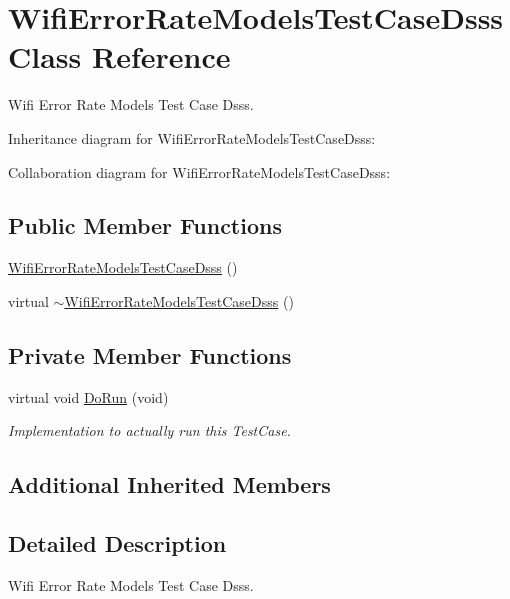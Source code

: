 \hypertarget{classWifiErrorRateModelsTestCaseDsss}{}\section{Wifi\+Error\+Rate\+Models\+Test\+Case\+Dsss Class Reference}
\label{classWifiErrorRateModelsTestCaseDsss}


Wifi Error Rate Models Test Case Dsss.  




Inheritance diagram for Wifi\+Error\+Rate\+Models\+Test\+Case\+Dsss\+:


Collaboration diagram for Wifi\+Error\+Rate\+Models\+Test\+Case\+Dsss\+:
\subsection*{Public Member Functions}
\begin{DoxyCompactItemize}
\item 
\hyperlink{classWifiErrorRateModelsTestCaseDsss_af4057fa8aa01337aef8dde760cce58ed}{Wifi\+Error\+Rate\+Models\+Test\+Case\+Dsss} ()
\item 
virtual \hyperlink{classWifiErrorRateModelsTestCaseDsss_a1b72308f7c00e3222d6d9fe3e170dd42}{$\sim$\+Wifi\+Error\+Rate\+Models\+Test\+Case\+Dsss} ()
\end{DoxyCompactItemize}
\subsection*{Private Member Functions}
\begin{DoxyCompactItemize}
\item 
virtual void \hyperlink{classWifiErrorRateModelsTestCaseDsss_a9d90cab0287b443edea29e5bcaf44e06}{Do\+Run} (void)
\begin{DoxyCompactList}\small\item\em Implementation to actually run this Test\+Case. \end{DoxyCompactList}\end{DoxyCompactItemize}
\subsection*{Additional Inherited Members}


\subsection{Detailed Description}
Wifi Error Rate Models Test Case Dsss. 

